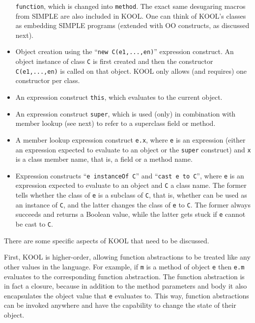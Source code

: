 \begin{latexComment}
\begin{itemize}
\texttt{function}, which is changed into \texttt{method}.  The exact same
desugaring macros from SIMPLE are also included in KOOL.  One can think of
KOOL's classes as embedding SIMPLE programs (extended with OO constructs,
as discussed next).
\item Object creation using the ``\texttt{new C(e1,...,en)}'' expression
construct.  An object instance of class \texttt{C} is first created and then
the constructor \texttt{C(e1,...,en)} is called on that object.  KOOL only
allows (and requires) one constructor per class.
\item An expression construct \texttt{this}, which evaluates to the current
object.
\item An expression construct \texttt{super}, which is used (only) in
combination with member lookup (see next) to refer to a superclass field or
method.
\item A member lookup expression construct \texttt{e.x}, where \texttt{e}
is an expression (either an expression expected to evaluate to an object
or the \texttt{super} construct) and \texttt{x} is a class member name,
that is, a field or a method name.
\item Expression constructs ``\texttt{e instanceOf C}'' and
``\texttt{cast e to C}'', where \texttt{e} is an expression expected to evaluate
to an object and \texttt{C} a class name.  The former tells whether the class
of \texttt{e} is a subclass of \texttt{C}, that is, whether can be used as an
instance of \texttt{C}, and the latter changes the class of \texttt{e} to
\texttt{C}.  The former always succeeds and returns a Boolean value, while
the latter gets stuck if \texttt{e} cannot be cast to \texttt{C}.
\end{itemize}

There are some specific aspects of KOOL that need to be discussed.

First, KOOL is higher-order, allowing function abstractions to be treated like
any other values in the language.  For example, if \texttt{m} is a method of
object \texttt{e} then \texttt{e.m} evaluates to the corresponding function
abstraction.  The function abstraction is in fact a closure, because in addition
to the method parameters and body it also encapsulates the object value that
\texttt{e} evaluates to.  This way, function abstractions can be invoked
anywhere and have the capability to change the state of their object.


\end{latexComment}
